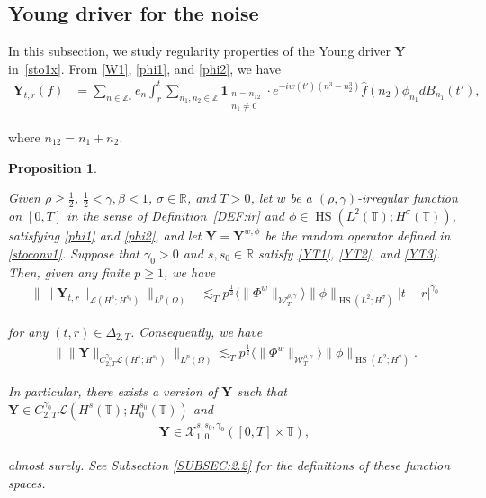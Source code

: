 \documentclass[letterpaper, 11pt,  reqno]{amsart}
\newtheorem{proposition}[theorem]{Proposition}
\DeclareMathOperator{\HS}{HS}
\newcommand{\1}{\hspace{0.5mm}\textup{I}\hspace{0.5mm}}
\newcommand{\noi}{\noindent}
\newcommand{\Z}{\mathbb{Z}}
\newcommand{\R}{\mathbb{R}}
\newcommand{\T}{\mathbb{T}}
\newcommand{\be}{\beta}
\newcommand{\Dl}{\Delta}
\newcommand{\g}{\gamma}
\newcommand{\s}{\sigma}
\newcommand{\ft}{\widehat}
\newcommand{\les}{\lesssim}
\newcommand{\jb}[1]
{\langle #1 \rangle}
\newcommand{\ind}{\mathbf 1}
\newcommand{\cX}{\mathcal{X}}
\newcommand{\W}{\mathcal{W}}
\newcommand{\Om}{\Omega}
\newcommand{\LOP}{\mathcal{L}}
\newcommand{\YY}{\mathbf{Y}}
\numberwithin{equation}{section}
\numberwithin{theorem}{section}
\begin{document}
 
 
 


 
 \subsection{Young driver
 for the noise}
\label{SUBSEC:drive2}

In this subsection, 
we study regularity properties
of the Young 
driver $\YY$ in~\eqref{sto1x}.
From 
\eqref{W1}, \eqref{phi1}, and \eqref{phi2}, we have 
\begin{align}
\YY_{t, r}(f)
&
 = \sum_{n\in \Z_*} e_n 
 \int_r^t \sum_{n_1, n_2  \in \Z} \ind_{\substack{n = n_{12}\\n_1\ne 0}}
\cdot  e^{- i w(t') (n^3 - n_2^3)}\ft f(n_2) \phi_{n_1}    d B_{n_1}(t'), 
\label{stoconv1}
\end{align}

\noi
where
 $n_{12} = n_1 + n_2$.


\begin{proposition}
\label{PROP:drive2}

Given 
$\rho \ge\frac 12$,
$\frac 12 < \g, \be < 1$, $ \s \in \R$, and $T > 0$, 
let 
$w$ be 
 a $(\rho,\g)$-irregular function on $[0, T]$ in the sense of Definition~\ref{DEF:ir}
 and 
$\phi \in \HS(L^2(\T); H^\s(\T))$, satisfying \eqref{phi1} and \eqref{phi2},
and 
let  $\YY = \YY^{w, \phi}$ be 
the random operator 
 defined in \eqref{stoconv1}.
Suppose that 
$  \g_0 >0$ and $s, s_0 \in \R$ satisfy 
\eqref{YT1}, \eqref{YT2}, and \eqref{YT3}. 
 Then, given any finite $p \ge 1$, we have 
\begin{align}
\big\| \|  \YY_{t,r}  \|_{\LOP(H^s; H^{s_0})} \big\|_{L^p(\Om)} 
 & \les_T  p^\frac 12 
\jb{\|\Phi^w\|_{  \W^{\rho,\g}_T} }
\| \phi\|_{\HS(L^2;H^\s)} 
  |t-r|^{\g_0}
\label{YG1}
\end{align}

\noi
for any   $(t,r) \in \Dl_{2,T}$.
Consequently, we have 
\begin{align}
\big\| \| \YY\|_{C^{\g_0}_{2,T} \LOP(H^s;H^{s_0})} \big\|_{L^p(\Om)} 
\les_T 
p^\frac 12 
\jb{\|\Phi^w\|_{  \W^{\rho,\g}_T} }
 \| \phi\|_{\HS(L^2;H^\s)} .
\label{YG1a}
\end{align}


\noi
In particular, 
there exists a version of $\YY$
such that 
$\YY \in C^{\g_0}_{2,T} \LOP(H^s(\T);H^{s_0}_0(\T))$
and
\begin{align}
\YY \in  \cX^{s, s_0, \g_0}_{1, 0} ([0, T]\times \T) ,
\label{YG1b}
\end{align}

\noi
almost surely.
See Subsection \ref{SUBSEC:2.2}
for the definitions of these function spaces.





\end{proposition}
\end{document}
